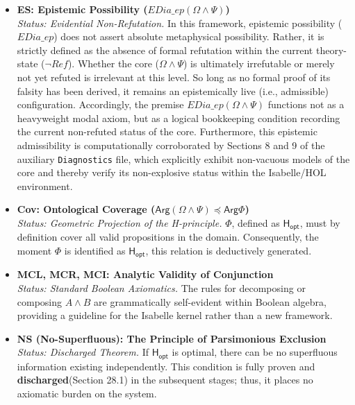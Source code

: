 \documentclass[a4paper, 11pt]{article}
\theoremstyle{plain}
\theoremstyle{definition}
\newcommand{\Arg}{\mathsf{Arg}}           %
\newcommand{\Hopt}{\mathsf{H_{opt}}}       %
\begin{document}
\begin{itemize}
    \item \textbf{ES: Epistemic Possibility ($EDia\_ep (\Omega \wedge \Psi)$)} \\
\textit{Status: Evidential Non-Refutation.} In this framework, epistemic possibility ($EDia\_ep$) does not assert absolute metaphysical possibility. Rather, it is strictly defined as the absence of formal refutation within the current theory-state ($\neg Ref$). Whether the core ($\Omega \wedge \Psi$) is ultimately irrefutable or merely not yet refuted is irrelevant at this level. So long as no formal proof of its falsity has been derived, it remains an epistemically live (i.e., admissible) configuration. Accordingly, the premise $EDia\_ep (\Omega \wedge \Psi)$ functions not as a heavyweight modal axiom, but as a logical bookkeeping condition recording the current non-refuted status of the core. Furthermore, this epistemic admissibility is computationally corroborated by Sections 8 and 9 of the auxiliary \texttt{Diagnostics} file, which explicitly exhibit non-vacuous models of the core and thereby verify its non-explosive status within the Isabelle/HOL environment.
   
    \item \textbf{Cov: Ontological Coverage ($\Arg (\Omega \wedge \Psi) \preceq \Arg \Phi$)} \\
    \textit{Status: Geometric Projection of the H-principle.} $\Phi$, defined as $\Hopt$, must by definition cover all valid propositions in the domain. Consequently, the moment $\Phi$ is identified as $\Hopt$, this relation is deductively generated.
   
    \item \textbf{MCL, MCR, MCI: Analytic Validity of Conjunction} \\
    \textit{Status: Standard Boolean Axiomatics.} The rules for decomposing or composing $A \wedge B$ are grammatically self-evident within Boolean algebra, providing a guideline for the Isabelle kernel rather than a new framework.
   
    \item \textbf{NS (No-Superfluous): The Principle of Parsimonious Exclusion} \\
    \textit{Status: Discharged Theorem.} If $\Hopt$ is optimal, there can be no superfluous information existing independently. This condition is fully proven and \textbf{discharged}(Section 28.1) in the subsequent stages; thus, it places no axiomatic burden on the system.
\end{itemize}
\end{document}
